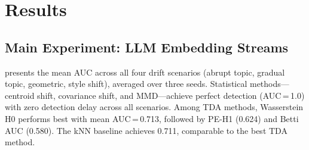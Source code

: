 \section{Results}
\label{sec:results}

\subsection{Main Experiment: LLM Embedding Streams}
\label{sec:main_results}

 presents the mean AUC across all four drift scenarios (abrupt topic, gradual topic, geometric, style shift), averaged over three seeds. Statistical methods---centroid shift, covariance shift, and MMD---achieve perfect detection (AUC\,=\,1.0) with zero detection delay across all scenarios. Among TDA methods, Wasserstein H0 performs best with mean AUC\,=\,0.713, followed by PE-H1 (0.624) and Betti AUC (0.580). The kNN baseline achieves 0.711, comparable to the best TDA method.

\begin{table}[t]
    \centering
    \caption{Mean detection performance across all drift scenarios (3 seeds). Best results per column in \textbf{bold}. Statistical methods achieve perfect AUC on natural topic drift, while TDA methods show moderate sensitivity.}
    \label{tab:main_results}
\end{table}


